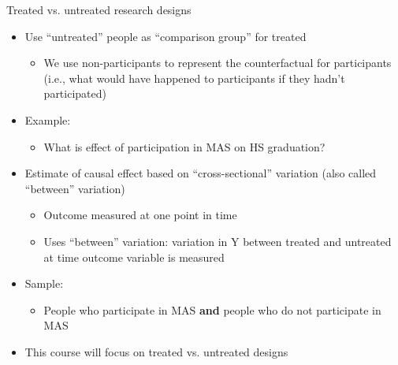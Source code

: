 \begin{frame}{Treated vs. untreated research designs}
		\begin{itemize}
		\item Use ``untreated'' people as ``comparison group'' for treated
		\begin{itemize}
			\item We use non-participants to represent the counterfactual for participants (i.e., what would have happened to participants if they hadn't participated)
		\end{itemize}
		\vspace{2mm}
		\item Example:
		\begin{itemize}
			\item What is effect of participation in MAS on HS graduation?
		\end{itemize}
		\vspace{2mm}
		\item Estimate of causal effect based on ``cross-sectional'' variation (also called ``between'' variation)
			\begin{itemize}
			\item Outcome measured at one point in time
			\item Uses ``between'' variation: variation in Y between treated and untreated at time outcome variable is measured
			\end{itemize}
		\item Sample:
			\begin{itemize}
			\item People who participate in MAS \textbf{and} people who do not participate in MAS
			\end{itemize}
		\vspace{2mm}
		\item This course will focus on treated vs. untreated designs
		\end{itemize}

\end{frame}

